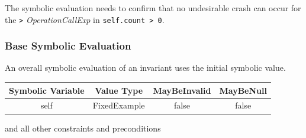 \documentclass[
]{ceurart}
\begin{document}
The symbolic evaluation needs to confirm that no undesirable crash can occur for the \verb|>| \emph{OperationCallExp} in \verb|self.count > 0|.

\subsubsection{Base Symbolic Evaluation}

An overall symbolic evaluation of an invariant uses the initial symbolic value.
\begin{center}
	\begin{tabular}{|c||c|c||c|}
		\hline
		Symbolic Variable & Value Type & MayBeInvalid & MayBeNull \\
		\hline
		self & FixedExample & false & false \\
		\hline
	\end{tabular}
\end{center}
 and all other constraints and preconditions
\end{document}
